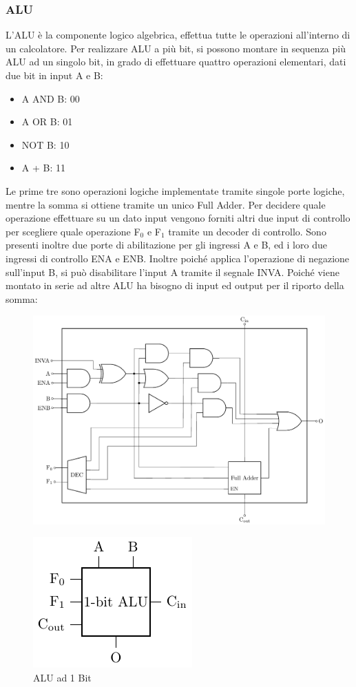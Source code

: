 \documentclass{article}
\numberwithin{equation}{subsection}
\begin{document}
\subsubsection{ALU}

L'ALU è la componente logico algebrica, effettua tutte le operazioni all'interno di un calcolatore. Per realizzare ALU a più bit, si possono montare in sequenza più ALU ad un singolo bit, in grado di 
effettuare quattro operazioni elementari, dati due bit in input A e B:
\begin{itemize}
    \item A AND B: 00
    \item A OR B: 01
    \item NOT B: 10
    \item A + B: 11
\end{itemize}
Le prime tre sono operazioni logiche implementate tramite singole porte logiche, mentre la somma si ottiene tramite un unico Full Adder. Per decidere quale operazione effettuare su un dato 
input vengono forniti altri due input di controllo per scegliere quale operazione F$_0$ e F$_1$ tramite un decoder di controllo. Sono presenti inoltre due porte di abilitazione per gli ingressi A e B, ed i loro due 
ingressi di controllo ENA e ENB. Inoltre poiché applica l'operazione di negazione sull'input B, si può disabilitare l'input A tramite il segnale INVA. Poiché viene montato in serie ad altre 
ALU ha bisogno di input ed output per il riporto della somma:

\begin{figure}[H]%
    \centering%
    \includegraphics[scale=0.84]{alu-1-bit.pdf}%
\end{figure}
\begin{figure}[H]%
    \centering%
    \includegraphics{alu-1-bit-compatta.pdf}%
    \caption{ALU ad 1 Bit}%
\end{figure}
\end{document}
